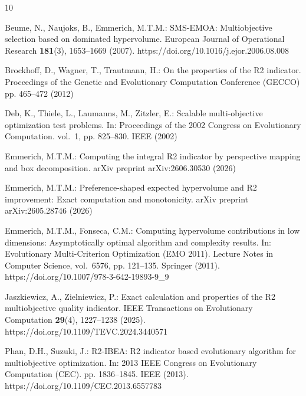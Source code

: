 \documentclass[runningheads]{llncs}
\begin{document}
\begin{thebibliography}{10}
\providecommand{\url}[1]{\texttt{#1}}
\providecommand{\urlprefix}{URL }
\providecommand{\doi}[1]{https://doi.org/#1}

Beume, N., Naujoks, B., Emmerich, M.T.M.: {SMS-EMOA}: Multiobjective selection
  based on dominated hypervolume. European Journal of Operational Research
  \textbf{181}(3),  1653--1669 (2007). \doi{10.1016/j.ejor.2006.08.008}

Brockhoff, D., Wagner, T., Trautmann, H.: On the properties of the {R2}
  indicator. Proceedings of the Genetic and Evolutionary Computation Conference
  (GECCO) pp. 465--472 (2012)

Deb, K., Thiele, L., Laumanns, M., Zitzler, E.: Scalable multi-objective
  optimization test problems. In: Proceedings of the 2002 Congress on
  Evolutionary Computation. vol.~1, pp. 825--830. IEEE (2002)

Emmerich, M.T.M.: Computing the integral {R2} indicator by perspective mapping
  and box decomposition. arXiv preprint arXiv:2606.30530  (2026)

Emmerich, M.T.M.: Preference-shaped expected hypervolume and {R2} improvement:
  Exact computation and monotonicity. arXiv preprint arXiv:2605.28746  (2026)

Emmerich, M.T.M., Fonseca, C.M.: Computing hypervolume contributions in low
  dimensions: Asymptotically optimal algorithm and complexity results. In:
  Evolutionary Multi-Criterion Optimization (EMO 2011). Lecture Notes in
  Computer Science, vol.~6576, pp. 121--135. Springer (2011).
  \doi{10.1007/978-3-642-19893-9_9}

Jaszkiewicz, A., Zielniewicz, P.: Exact calculation and properties of the {R2}
  multiobjective quality indicator. IEEE Transactions on Evolutionary
  Computation  \textbf{29}(4),  1227--1238 (2025).
  \doi{10.1109/TEVC.2024.3440571}

Phan, D.H., Suzuki, J.: {R2-IBEA}: {R2} indicator based evolutionary algorithm
  for multiobjective optimization. In: 2013 IEEE Congress on Evolutionary
  Computation (CEC). pp. 1836--1845. IEEE (2013).
  \doi{10.1109/CEC.2013.6557783}


\end{thebibliography}
\end{document}
